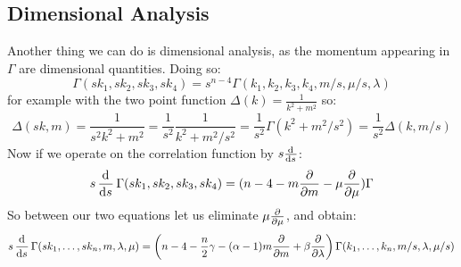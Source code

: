 \subsection{Dimensional Analysis}
Another thing we can do is dimensional analysis, as the momentum appearing in $\Gamma$ are dimensional quantities. Doing so:
\begin{equation}
    \Gamma(sk_1, sk_2, sk_3, sk_4) = s^{n-4}\Gamma(k_1, k_2, k_3, k_4, m/s, \mu/s, \lambda)
\end{equation}
for example with the two point function $\Delta(k) = \frac{1}{k^2 + m^2}$ so:
\begin{equation}
    \Delta(sk, m) = \frac{1}{s^2k^2 + m^2} = \frac{1}{s^2}\frac{1}{k^2 + m^2/s^2} = \frac{1}{s^2}\Gamma(k^2 + m^2/s^2) = \frac{1}{s^2}\Delta(k, m/s)
\end{equation}
Now if we operate on the correlation function by $s\od{}{s}$:
\begin{equation}
    s\dod{}{s}\Gamma(sk_1, sk_2, sk_3, sk_4) = (n - 4 - m\dpd{}{m} - \mu \dpd{}{\mu})\Gamma
\end{equation}
So between our two equations let us eliminate $\mu \frac{\partial }{\partial \mu}$, and obtain:
\begin{equation}\label{eq-RGflow2}
    s\dod{}{s}\Gamma(sk_1, \ldots, sk_n, m, \lambda, \mu) = \left(n-4-\frac{n}{2}\gamma - (\alpha - 1)m\dpd{}{m} + \beta\dpd{}{\lambda}\right)\Gamma(k_1, \ldots, k_n, m/s, \lambda, \mu/s)
\end{equation}

